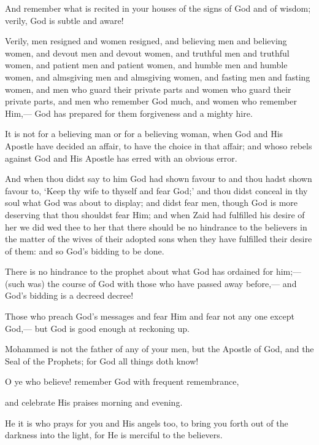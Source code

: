 \documentclass[fontsize=14pt, letterpaper, notitlepage, openany, DIV=12]{scrbook} %
\begin{document}
\noindent[33:34]
And remember what is recited in your houses of the signs of God and of wisdom; verily,
God is subtle and aware!

\noindent[33:35]
Verily, men resigned and women resigned, and believing men and believing women, and
devout men and devout women, and truthful men and truthful women, and patient men and
patient women, and humble men and humble women, and almsgiving men and almsgiving
women, and fasting men and fasting women, and men who guard their private parts and women
who guard their private parts, and men who remember God much, and women who remember
Him,--- God has prepared for them forgiveness and a mighty hire.

\noindent[33:36]
It is not for a believing man or for a believing woman, when God and His Apostle have
decided an affair, to have the choice in that affair; and whoso rebels against God and His Apostle
has erred with an obvious error.

\noindent[33:37]
And when thou didst say to him God had shown favour to and thou hadst shown favour
to, `Keep thy wife to thyself and fear God;' and thou didst conceal in thy soul what God was
about to display; and didst fear men, though God is more deserving that thou shouldst fear Him;
and when Zaid had fulfilled his desire of her we did wed thee to her that there should be no
hindrance to the believers in the matter of the wives of their adopted sons when they have
fulfilled their desire of them: and so God's bidding to be done.

\noindent[33:38]
There is no hindrance to the prophet about what God has ordained for him;---(such was)
the course of God with those who have passed away before,--- and God's bidding is a decreed
decree!

\noindent[33:39]
Those who preach God's messages and fear Him and fear not any one except God,--- but
God is good enough at reckoning up.

\noindent[33:40]
Mohammed is not the father of any of your men, but the Apostle of God, and the Seal of
the Prophets; for God all things doth know!

\noindent[33:41]
O ye who believe! remember God with frequent remembrance,

\noindent[33:42]
and celebrate His praises morning and evening.

\noindent[33:43]
He it is who prays for you and His angels too, to bring you forth out of the darkness into
the light, for He is merciful to the believers.
\end{document}
